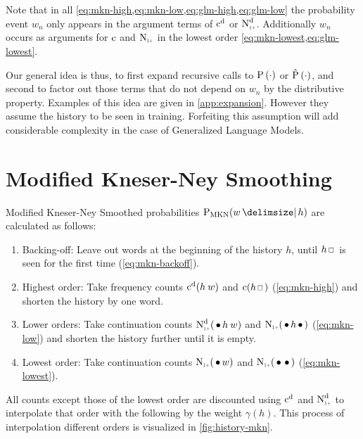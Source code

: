 Note that in all \cref{eq:mkn-high,eq:mkn-low,eq:glm-high,eq:glm-low} the
probability event $w_n$ only appears in the argument terms of
$\DiscountedCount$ or $\DiscountedCount*$.
Additionally $w_n$ occurs as arguments for $\operatorname{c}$ and $\ContCountIp$ in the
lowest order \cref{eq:mkn-lowest,eq:glm-lowest}.

Our general idea is thus, to first expand recursive calls to
$\Prob(\DummyArg)$ or $\Prob*(\DummyArg)$, and second to factor
out those terms that do not depend on $w_n$ by the distributive property.
Examples of this idea are given in \cref{app:expansion}.
However they assume the history to be seen in training.
Forfeiting this assumption will add considerable complexity in the case
of Generalized Language Models.

\clearpage %
\section{Modified Kneser-Ney Smoothing}

Modified Kneser-Ney Smoothed probabilities $\ProbMKN{w}{h}$ are calculated as
follows:
\begin{enumerate}
  \item Backing-off: Leave out words at the beginning of the history $h$, until
    $h \Skp$ is seen for the first time (\cref{eq:mkn-backoff}).
  \item Highest order: Take frequency counts $\DiscountedCount(h \: w)$ and
    $\Count(h \Skp)$ (\cref{eq:mkn-high}) and shorten the history by one word.
  \item Lower orders: Take continuation counts $\DiscountedCount*(\WSkp h \: w)$
    and $\ContCountIp(\WSkp h \WSkp)$ (\cref{eq:mkn-low}) and shorten the
    history further until it is empty.
  \item Lowest order: Take continuation counts $\ContCountIp(\WSkp w)$ and
    $\ContCountIp(\WSkp \WSkp)$ (\cref{eq:mkn-lowest}).
\end{enumerate}
All counts except those of the lowest order are discounted using
$\DiscountedCount$ and $\DiscountedCount*$ to interpolate that order with the
following by the weight $\gamma(h)$.
This process of interpolation different orders is visualized in
\cref{fig:history-mkn}.

